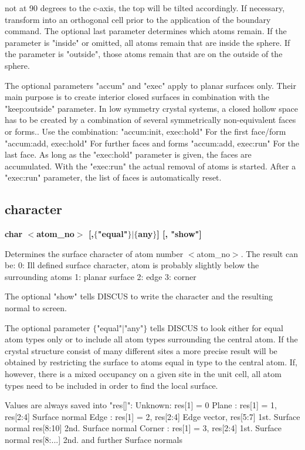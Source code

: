        not at 90 degrees to the c-axis, the top will be tilted 
       accordingly. If necessary, transform into an orthogonal cell 
       prior to the application of the boundary command. 
       The optional last parameter determines which atoms remain. 
       If the parameter is "inside" or omitted, all atoms remain that 
       are inside the sphere. 
       If the parameter is "outside", those atoms remain that are on 
       the outside of the sphere. 
\par
The optional parameters "accum" and "exec" apply to planar surfaces 
only. Their main purpose is to create interior closed surfaces 
in combination with the "keep:outside" parameter. 
In low symmetry crystal systems, a closed hollow space has to be 
created by a combination of several symmetrically non-equivalent 
faces or forms.. Use the combination: 
"accum:init, exec:hold" For the first face/form 
"accum:add, exec:hold"  For further faces and forms 
"accum:add, exec:run"   For the last face. 
As long as the "exec:hold" parameter is given, the faces are 
accumulated. With the "exec:run" the actual removal of atoms 
is started. 
After a "exec:run" parameter, the list of faces is automatically 
reset. 
\subsection*{character}
{\bf char $ <$atom\_no$> $ [,$ \{$"equal"$\} $$| $$ \{$any$\} $] [, "show"] \par }
\par
\vspace{3pt}
Determines the surface character of atom number $ <$atom\_no$> $. 
The result can be: 
0: Ill defined surface character, atom is probably slightly below 
       the surrounding atoms 
1: planar surface 
2: edge 
3: corner 
\par
The optional "show" tells DISCUS to write the character and 
the resulting normal to screen. 
\par
The optional parameter $ \{$"equal"$| $"any"$\} $ tells DISCUS to look either 
for equal atom types only or to include all atom types surrounding 
the central atom. If the crystal structure consist of many different 
sites a more precise result will be obtained by restricting the 
surface to atoms equal in type to the central atom. If, however, 
there is a mixed occupancy on a given site in the unit cell, all 
atom types need to be included in order to find the local surface. 
\par
Values are always saved into "res[]": 
Unknown: res[1] = 0 
Plane  : res[1] = 1, res[2:4]   Surface normal 
Edge   : res[1] = 2, res[2:4]   Edge vector, 
                     res[5:7]   1st. Surface normal 
                     res[8:10]  2nd. Surface normal 
Corner : res[1] = 3, res[2:4]   1st. Surface normal 
                     res[8:...] 2nd. and further Surface normals 

